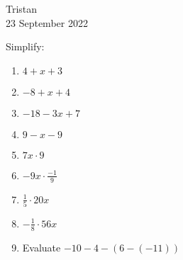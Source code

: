 \documentclass[14pt]{extarticle} %
\begin{document}
\hfill Tristan\\
\null\hfill 23 September 2022

\vspace{10mm}

Simplify:
\begin{enumerate}[label=\Alph*.), itemsep=\fill]
\item  $4+x+3$
\item $-8+x+4$
\item $-18-3x+7$
\item $9-x-9$
\item $7x \cdot 9$
\vfill\clearpage
\item $-9x \cdot \frac{-1}{9}$
\item $\frac{1}{5} \cdot 20x$
\item $-\frac{1}{8} \cdot 56x$
\item  Evaluate $-10-4-(6-(-11))$
\vfill\end{enumerate}
\end{document}
